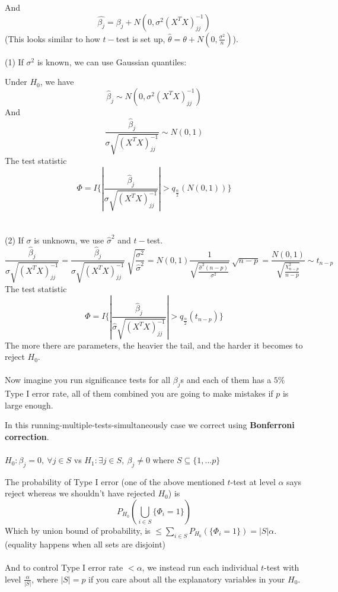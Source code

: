 \documentclass{article}
\begin{document}
And
$$
\hat{\beta_j} = \beta_j + \mathit{N}(0, \sigma^2 (X^T X)^{-1}_{jj})
$$
(This looks similar to how $t-$test is set up, $\hat{\theta} = \theta + \mathit{N}(0, \frac{\sigma^2}{n})$).

(1) If $\sigma^2$ is known, we can use Gaussian quantiles:

Under $H_0$, we have
$$
\hat{\beta}_j \sim \mathit{N}(0, \sigma^2 (X^T X)^{-1}_{jj})
$$
And
$$
\frac{\hat{\beta}_j}{\sigma \sqrt{(X^T X)^{-1}_{jj}}} \sim \mathit{N}(0, 1)
$$
The test statistic
$$
\Phi = \mathit{I}\{|\frac{\hat{\beta}_j}{\sigma \sqrt{(X^T X)^{-1}_{jj}}}| > q_{\frac{\alpha}{2}} (\mathit{N}(0, 1))\}
$$
\\
\\
(2) If $\sigma$ is unknown, we use $\hat{\sigma}^2$ and $t-$test.
$$
\frac{\hat{\beta}_j}{\hat{\sigma} \sqrt{(X^T X)^{-1}_{jj}}} = \frac{\hat{\beta}_j}{\sigma \sqrt{(X^T X)^{-1}_{jj}}} ~ \sqrt{\frac{\sigma^2}{\hat{\sigma}^2}} = \mathit{N}(0, 1) \frac{1}{\sqrt{\frac{\hat{\sigma}^2 (n - p)}{\sigma^2}}} ~ \sqrt{n - p} = \frac{\mathit{N}(0, 1)}{\sqrt{\frac{\chi^2_{n - p}}{n - p}}} \sim t_{n - p}
$$
The test statistic
$$
\Phi = \mathit{I}\{|\frac{\hat{\beta}_j}{\hat{\sigma} \sqrt{(X^T X)^{-1}_{jj}}}| > q_{\frac{\alpha}{2}} (t_{n - p})\}
$$
The more there are parameters, the heavier the tail, and the harder it becomes to reject $H_0$.
\\
\\
Now imagine you run significance tests for all $\beta_j$s and each of them has a $5\%$ Type I error rate, all of them combined you are going to make mistakes if $p$ is large enough.

In this running-multiple-tests-simultaneously case we correct using \textbf{Bonferroni correction}.
\\
\\
$H_0: \beta_j = 0, ~ \forall j \in S$ vs $H_1: \exists j \in S, ~ \beta_j \neq 0$ where $S \subseteq \{1, \dots p\}$

The probability of Type I error (one of the above mentioned $t$-test at level $\alpha$ says reject whereas we shouldn't have rejected $H_0$) is
$$
P_{H_0}(\bigcup_{i \in S} \{\Phi_i = 1\})
$$
Which by union bound of probability, is $\leq \sum_{i \in S}P_{H_0}(\{\Phi_i = 1\}) = |S| \alpha$.
(equality happens when all sets are disjoint)
\\
\\
And to control Type I error rate $< \alpha$,
we instead run each individual $t$-test with level $\frac{\alpha}{|S|}$, where $|S| = p$ if you care about all the explanatory variables in your $H_0$.
\end{document}
